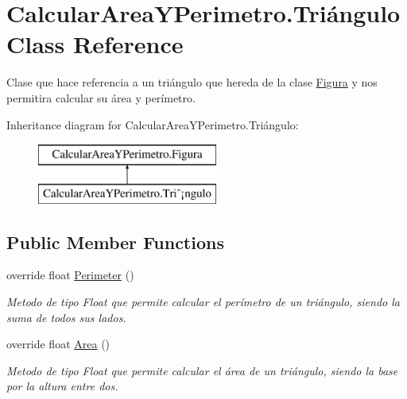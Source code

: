 \hypertarget{class_calcular_area_y_perimetro_1_1_tri_xC3_xA1ngulo}{}\section{Calcular\+Area\+Y\+Perimetro.\+Triángulo Class Reference}
\label{class_calcular_area_y_perimetro_1_1_tri_xC3_xA1ngulo}


Clase que hace referencia a un triángulo que hereda de la clase \hyperlink{class_calcular_area_y_perimetro_1_1_figura}{Figura} y nos permitira calcular su área y perímetro.  


Inheritance diagram for Calcular\+Area\+Y\+Perimetro.\+Triángulo\+:\begin{figure}[H]
\begin{center}
\leavevmode
\includegraphics[height=2.000000cm]{class_calcular_area_y_perimetro_1_1_tri_xC3_xA1ngulo}
\end{center}
\end{figure}
\subsection*{Public Member Functions}
\begin{DoxyCompactItemize}
\item 
override float \hyperlink{class_calcular_area_y_perimetro_1_1_tri_xC3_xA1ngulo_aac49654dd9b222bf2c05daa361b9c454}{Perimeter} ()
\begin{DoxyCompactList}\small\item\em Metodo de tipo Float que permite calcular el perímetro de un triángulo, siendo la suma de todos sus lados. \end{DoxyCompactList}\item 
override float \hyperlink{class_calcular_area_y_perimetro_1_1_tri_xC3_xA1ngulo_a269c17af860a19a59a1476b57a182e82}{Area} ()
\begin{DoxyCompactList}\small\item\em Metodo de tipo Float que permite calcular el área de un triángulo, siendo la base por la altura entre dos. \end{DoxyCompactList}\end{DoxyCompactItemize}
